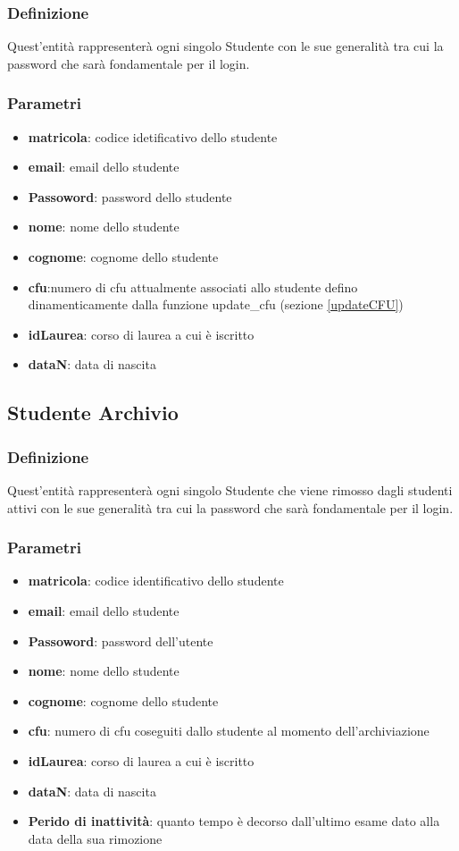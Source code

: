\subsubsection{Definizione}
Quest'entità rappresenterà ogni singolo Studente con le sue generalità tra cui la password che sarà fondamentale per il login.
\subsubsection{Parametri}
\begin{itemize}
    \item \textbf{matricola}: codice idetificativo dello studente 
    \item \textbf{email}: email dello studente
    \item \textbf{Passoword}: password dello studente
    \item \textbf{nome}: nome dello studente
    \item \textbf{cognome}: cognome dello studente
    \item \textbf{cfu}:numero di cfu attualmente associati allo studente defino dinamenticamente dalla funzione update\_cfu (sezione \ref{updateCFU})
    \item \textbf{idLaurea}: corso di laurea a cui è iscritto
    \item \textbf{dataN}: data di nascita 
\end{itemize}

 \subsection{Studente Archivio} \label{Studente Archivio}

\subsubsection{Definizione}
Quest'entità rappresenterà ogni singolo Studente che viene rimosso dagli studenti attivi con le sue generalità tra cui la password che sarà fondamentale per il login.
\subsubsection{Parametri}
\begin{itemize}
    \item \textbf{matricola}: codice identificativo dello studente 
    \item \textbf{email}: email dello studente
    \item \textbf{Passoword}: password dell'utente
    \item \textbf{nome}: nome dello studente
    \item \textbf{cognome}: cognome dello studente
    \item \textbf{cfu}: numero di cfu coseguiti dallo studente al momento dell'archiviazione
    \item \textbf{idLaurea}: corso di laurea a cui è iscritto
    \item \textbf{dataN}: data di nascita 
    \item \textbf{Perido di inattività}: quanto tempo è decorso dall'ultimo esame dato alla data della sua rimozione
\end{itemize}
 
